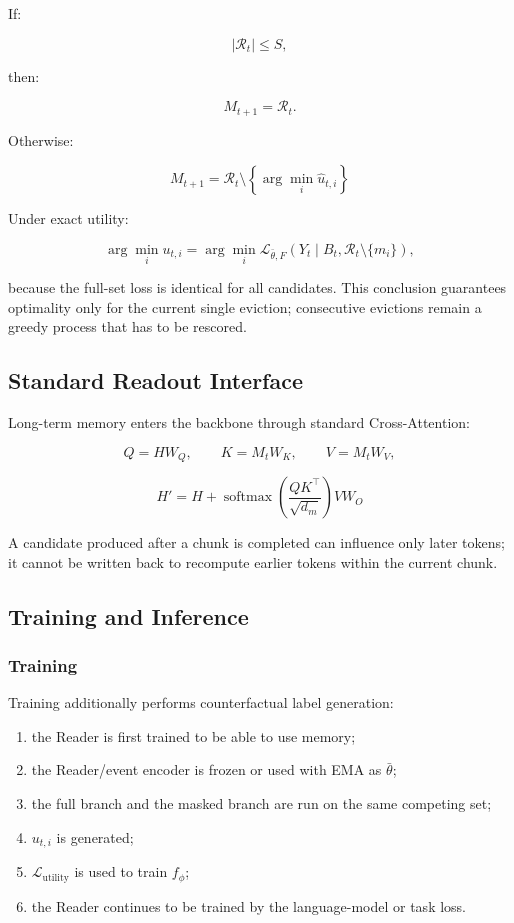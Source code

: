 If:

\[
|\mathcal R_t|\le S,
\]

then:

\[
M_{t+1}=\mathcal R_t.
\]

Otherwise:

\[
\boxed{
M_{t+1} =
\mathcal R_t
\setminus
\left\{ 
\arg\min_i\hat u_{t,i}
\right\}
}
\]

Under exact utility:

\[
\arg\min_i u_{t,i} =
\arg\min_i
\mathcal L_{\bar\theta,F}
\left(
Y_t\mid B_t,
\mathcal R_t\setminus\{ m_i\}
\right),
\]

because the full-set loss is identical for all candidates. This conclusion guarantees optimality only for the current single eviction; consecutive evictions remain a greedy process that has to be rescored.

\subsection{Standard Readout Interface}

Long-term memory enters the backbone through standard Cross-Attention:

\[
Q=HW_Q,\qquad K=M_tW_K,\qquad V=M_tW_V,
\]

\[
\boxed{
H' =
H+
\operatorname{softmax}
\left(
\frac{QK^\top}{\sqrt{d_m}}
\right)
VW_O
}
\]

A candidate produced after a chunk is completed can influence only later tokens; it cannot be written back to recompute earlier tokens within the current chunk.

\subsection{Training and Inference}

\subsubsection{Training}

Training additionally performs counterfactual label generation:

\begin{enumerate}
  \item the Reader is first trained to be able to use memory;
  \item the Reader/event encoder is frozen or used with EMA as $\bar\theta$;
  \item the full branch and the masked branch are run on the same competing set;
  \item $u_{t,i}$ is generated;
  \item $\mathcal L_{\operatorname{utility}}$ is used to train $f_\phi$;
  \item the Reader continues to be trained by the language-model or task loss.
\end{enumerate}

